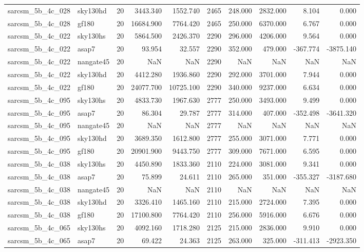 \begin{tabular}{llrrrrrrrr}
sarcsm\_5b\_4c\_028 & sky130hd & 20 & 3443.340 & 1552.740 & 2465 & 248.000 & 2832.000 & 8.104 & 0.000 \\
sarcsm\_5b\_4c\_028 & gf180 & 20 & 16684.900 & 7764.420 & 2465 & 250.000 & 6370.000 & 6.767 & 0.000 \\
sarcsm\_5b\_4c\_022 & sky130hs & 20 & 5864.500 & 2426.370 & 2290 & 296.000 & 4206.000 & 9.564 & 0.000 \\
sarcsm\_5b\_4c\_022 & asap7 & 20 & 93.954 & 32.557 & 2290 & 352.000 & 479.000 & -367.774 & -3875.140 \\
sarcsm\_5b\_4c\_022 & nangate45 & 20 & NaN & NaN & 2290 & NaN & NaN & NaN & NaN \\
sarcsm\_5b\_4c\_022 & sky130hd & 20 & 4412.280 & 1936.860 & 2290 & 292.000 & 3701.000 & 7.944 & 0.000 \\
sarcsm\_5b\_4c\_022 & gf180 & 20 & 24077.700 & 10725.100 & 2290 & 340.000 & 9237.000 & 6.634 & 0.000 \\
sarcsm\_5b\_4c\_095 & sky130hs & 20 & 4833.730 & 1967.630 & 2777 & 250.000 & 3493.000 & 9.499 & 0.000 \\
sarcsm\_5b\_4c\_095 & asap7 & 20 & 86.304 & 29.787 & 2777 & 314.000 & 407.000 & -352.498 & -3641.320 \\
sarcsm\_5b\_4c\_095 & nangate45 & 20 & NaN & NaN & 2777 & NaN & NaN & NaN & NaN \\
sarcsm\_5b\_4c\_095 & sky130hd & 20 & 3689.350 & 1612.800 & 2777 & 255.000 & 3071.000 & 7.771 & 0.000 \\
sarcsm\_5b\_4c\_095 & gf180 & 20 & 20901.900 & 9443.750 & 2777 & 309.000 & 7671.000 & 6.595 & 0.000 \\
sarcsm\_5b\_4c\_038 & sky130hs & 20 & 4450.890 & 1833.360 & 2110 & 224.000 & 3081.000 & 9.341 & 0.000 \\
sarcsm\_5b\_4c\_038 & asap7 & 20 & 75.899 & 24.611 & 2110 & 265.000 & 351.000 & -355.327 & -3187.680 \\
sarcsm\_5b\_4c\_038 & nangate45 & 20 & NaN & NaN & 2110 & NaN & NaN & NaN & NaN \\
sarcsm\_5b\_4c\_038 & sky130hd & 20 & 3326.410 & 1465.160 & 2110 & 215.000 & 2724.000 & 7.395 & 0.000 \\
sarcsm\_5b\_4c\_038 & gf180 & 20 & 17100.800 & 7764.420 & 2110 & 256.000 & 5916.000 & 6.676 & 0.000 \\
sarcsm\_5b\_4c\_065 & sky130hs & 20 & 4092.160 & 1718.280 & 2125 & 215.000 & 2836.000 & 9.910 & 0.000 \\
sarcsm\_5b\_4c\_065 & asap7 & 20 & 69.422 & 24.363 & 2125 & 263.000 & 325.000 & -311.413 & -2923.350 \\

\end{tabular}
